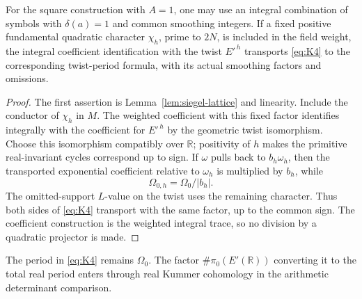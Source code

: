 \begin{corollary}
\label{cor:siegel-positive-twist}
For the square construction with \(A=1\), one may use an integral
combination of symbols with \(\delta(a)=1\) and common smoothing
integers.  If a fixed positive fundamental quadratic character
\(\chi_h\), prime to \(2N\), is included in the field weight, the
integral coefficient identification with the twist \(E'^{\,h}\)
transports \eqref{eq:K4} to the corresponding twist-period formula,
with its actual smoothing factors and omissions.
\end{corollary}

\begin{proof}
The first assertion is Lemma~\ref{lem:siegel-lattice} and linearity.
Include the conductor of \(\chi_h\) in \(M\).
The weighted coefficient with this fixed factor identifies integrally
with the coefficient for \(E'^{\,h}\) by the geometric twist
isomorphism.  Choose this isomorphism compatibly over \(\mathbb R\);
positivity of \(h\) makes the primitive real-invariant cycles correspond
up to sign.  If \(\omega\) pulls back to \(b_h\omega_h\), then the
transported exponential coefficient relative to \(\omega_h\) is
multiplied by \(b_h\), while
\[
                         \Omega_{0,h}=\Omega_0/|b_h|.
\]
The omitted-support \(L\)-value on the twist uses the remaining
character.  Thus both sides of \eqref{eq:K4} transport with the same
factor, up to the common sign.  The coefficient construction is the
weighted integral trace, so no division by a quadratic projector is
made.
\end{proof}

The period in \eqref{eq:K4} remains \(\Omega_0\).
The factor \(\#\pi_0(E'(\mathbb R))\) converting it to the total real
period enters through real Kummer cohomology in the arithmetic
determinant comparison.
